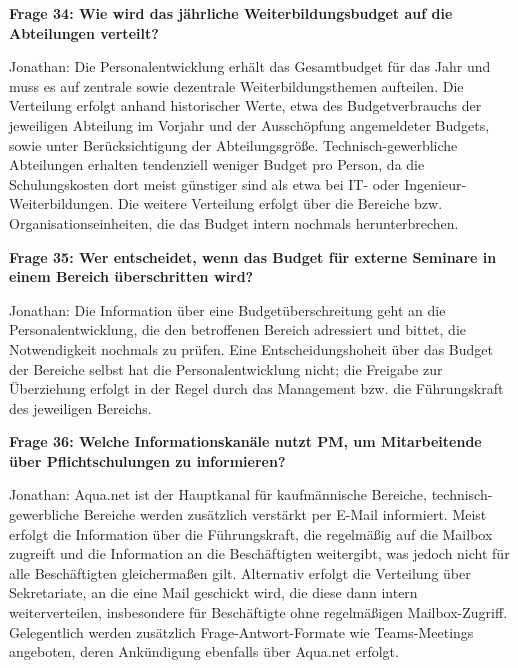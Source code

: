 \documentclass[
    12pt, 
    a4paper,
    ]{scrartcl} %
\begin{document}
\bigskip
{}

\textbf{Frage 34: Wie wird das j\"ahrliche Weiterbildungsbudget auf die Abteilungen verteilt?}

Jonathan: Die Personalentwicklung erh\"alt das Gesamtbudget f\"ur das Jahr und muss es auf zentrale sowie dezentrale Weiterbildungsthemen aufteilen. Die Verteilung erfolgt anhand historischer Werte, etwa des Budgetverbrauchs der jeweiligen Abteilung im Vorjahr und der Aussch\"opfung angemeldeter Budgets, sowie unter Ber\"ucksichtigung der Abteilungsgr\"o{\ss}e. Technisch-gewerbliche Abteilungen erhalten tendenziell weniger Budget pro Person, da die Schulungskosten dort meist g\"unstiger sind als etwa bei IT- oder Ingenieur-Weiterbildungen. Die weitere Verteilung erfolgt \"uber die Bereiche bzw. Organisationseinheiten, die das Budget intern nochmals herunterbrechen.

\medskip
\textbf{Frage 35: Wer entscheidet, wenn das Budget f\"ur externe Seminare in einem Bereich \"uberschritten wird?}

Jonathan: Die Information \"uber eine Budget\"uberschreitung geht an die Personalentwicklung, die den betroffenen Bereich adressiert und bittet, die Notwendigkeit nochmals zu pr\"ufen. Eine Entscheidungshoheit \"uber das Budget der Bereiche selbst hat die Personalentwicklung nicht; die Freigabe zur \"Uberziehung erfolgt in der Regel durch das Management bzw. die F\"uhrungskraft des jeweiligen Bereichs.

\bigskip
{}

\textbf{Frage 36: Welche Informationskan\"ale nutzt PM, um Mitarbeitende \"uber Pflichtschulungen zu informieren?}

Jonathan: Aqua.net ist der Hauptkanal f\"ur kaufm\"annische Bereiche, technisch-gewerbliche Bereiche werden zus\"atzlich verst\"arkt per E-Mail informiert. Meist erfolgt die Information \"uber die F\"uhrungskraft, die regelm\"a{\ss}ig auf die Mailbox zugreift und die Information an die Besch\"aftigten weitergibt, was jedoch nicht f\"ur alle Besch\"aftigten gleicherma{\ss}en gilt. Alternativ erfolgt die Verteilung \"uber Sekretariate, an die eine Mail geschickt wird, die diese dann intern weiterverteilen, insbesondere f\"ur Besch\"aftigte ohne regelm\"a{\ss}igen Mailbox-Zugriff. Gelegentlich werden zus\"atzlich Frage-Antwort-Formate wie Teams-Meetings angeboten, deren Ank\"undigung ebenfalls \"uber Aqua.net erfolgt.
\end{document}

